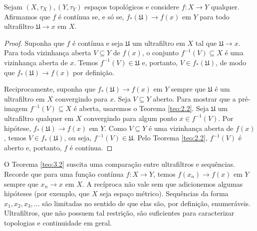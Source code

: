  \begin{theorem}
 \label{teo:3.2}
 Sejam 
 $(X, \tau_X), (Y, \tau_Y)$
 espaços topológicos e considere
 $f:X \to Y$
 qualquer. Afirmamos que
 $f$ é contínua se, e só se,
 $f_{*}(\mathfrak{U}) \to f(x)$
 em $Y$ para todo ultrafiltro
 $\mathfrak{U} \to x$ 
 em $X$.
 \end{theorem}
 
 \begin{proof}
 Suponha que 
 $f$
 é contínua e seja
 $\mathfrak{U}$
 um ultrafiltro em 
 $X$
 tal que
 $\mathfrak{U} \to x$.
 Para toda vizinhança aberta
 $V \subseteq Y$
 de
 $f(x)$,
 o conjunto
 $f^{-1}(V) \subseteq X$
 é uma vizinhança aberta de
 $x$.
 Temos
 $f^{-1}(V) \in \mathfrak{U}$
 e, portanto,
 $V \in f_*(\mathfrak{U})$,
 de modo que
 $f_*(\mathfrak{U}) \to f(x)$
 por definição.
 
 Reciprocamente, suponha que
 $f_*(\mathfrak{U}) \to f(x)$
 em 
 $Y$
 sempre que
 $\mathfrak{U}$
 é um ultrafiltro em
 $X$
 convergindo para
 $x$.
 Seja
 $V \subseteq Y$
 aberto.
 Para mostrar que a pré-imagem
 $f^{-1}(V) \subseteq X$
 é aberta, usaremos o Teorema \ref{teo:2.2}.
 Seja
 $\mathfrak{U}$
 um ultrafiltro qualquer em
 $X$
 convergindo para algum ponto
 $x \in f^{-1}(V)$.
 Por hipótese, 
 $f_*(\mathfrak{U}) \to f(x)$
 em
 $Y$.
 Como
 $V \subseteq Y$
 é uma vizinhança aberta de
 $f(x)$,
 temos
 $V \in f_*(\mathfrak{U})$,
 ou seja,
 $f^{-1}(V) \in \mathfrak{U}$.
 Pelo Teorema \ref{teo:2.2},
 $f^{-1}(V)$
 é aberto e, portanto,
 $f$
 é contínua.
 \end{proof}
 
 O Teorema \ref{teo:3.2} suscita uma comparação entre
 ultrafiltros e sequências.
 Recorde que para uma função contínua
 $f : X \to Y$,
 temos
 $f(x_n) \to f(x)$
 em
 $Y$
 sempre que
 $x_n \to x$
 em 
 $X$.
 A recíproca não vale sem que adicionemos algumas hipóteses 
 (por exemplo, que $X$ seja espaço métrico).
 Sequências da forma
 $x_1, x_2, x_3, \dots$
 são limitadas no sentido de que elas são, por definição, enumeráveis.
 Ultrafiltros, que não possuem tal restrição, são suficientes para 
 caracterizar topologias e continuidade em geral.
 
